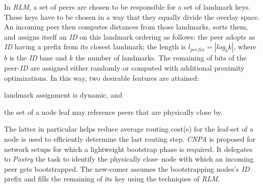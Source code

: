 In \emph{RLM}, a set of peers are chosen to be responsible 
for a set of landmark keys. 
These keys have to be chosen in a way that they equally divide the overlay
space. 
An incoming peer then computes distances from those landmarks,
sorts them, and assigns itself an \emph{ID} on this 
landmark ordering as follows:
the peer adopts as \emph{ID} having a prefix from its closest
landmark; the length is 
$l_{prefix}=|log_b k|$, where $b$ is the \emph{ID} base 
and $k$ the number of landmarks. 
The remaining of bits of the peer-\emph{ID} are assigned either 
randomly or computed with additional proximity optimizations.
In this way, two desirable features are attained:
\begin{inparaenum}
  \item landmark assignment is dynamic, and
  \item the set of a node leaf may reference peers that are 
	physically close by.
\end{inparaenum}
The latter in particular helps reduce average routing cost(s)
for the leaf-set of a node is used to efficiently determine the 
last routing step.
\emph{CNPA} is proposed for network setups for which a lightweight
bootstrap phase is required.
It delegates to \emph{Pastry} the task to identify the physically
close--node with which an incoming peer gets bootstrapped. 
The new-comer assumes the bootstrapping nodes's \emph{ID} prefix 
and fills the remaining of its key using the techniques of \emph{RLM}.

